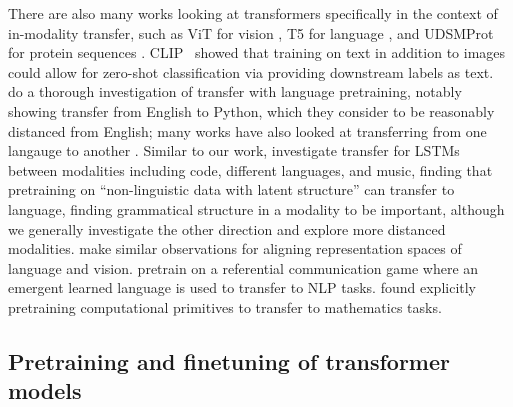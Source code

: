 There are also many works looking at transformers specifically in the context of in-modality transfer, such as ViT for vision \citep{dosovitskiy2020vit}, T5 for language \citep{raffel2019t5}, and UDSMProt for protein sequences \citep{strodthoff2020udsmprot}.
CLIP~\citep{radford2021clip} showed that training on text in addition to images could allow for zero-shot classification via providing downstream labels as text.
\cite{hernandez2021scaling} do a thorough investigation of transfer with language pretraining, notably showing transfer from English to Python, which they consider to be reasonably distanced from English; many works have also looked at transferring from one langauge to another \citep{artetxe2019cross, ponti2019towards}.
Similar to our work, \cite{papadimitriou2020music} investigate transfer for LSTMs between modalities including code, different languages, and music, finding that pretraining on ``non-linguistic data with latent structure'' can transfer to language, finding grammatical structure in a modality to be important, although we generally investigate the other direction and explore more distanced modalities. 
\cite{kiela2019supervised} make similar observations for aligning representation spaces of language and vision.
\cite{li2020communication} pretrain on a referential communication game where an emergent learned language is used to transfer to NLP tasks.
\cite{wu2021lime} found explicitly pretraining computational primitives to transfer to mathematics tasks.

\subsection{Pretraining and finetuning of transformer models}

